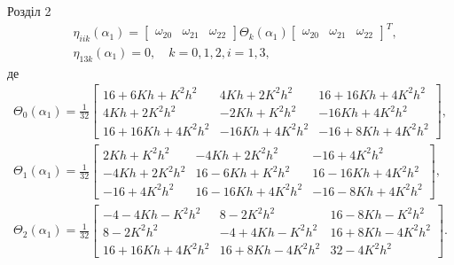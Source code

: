 \documentclass[8pt]{beamer}
\numberwithin{figure}{section}
\numberwithin{equation}{section}
\numberwithin{table}{section}
\begin{document}
\begin{frame}{Розділ 2}
\begin{equation}
\begin{aligned}
&\eta_{iik}\left(\alpha_1\right)=\left[\begin{array}{ccc}
\omega_{20} & \omega_{21} & \omega_{22}
\end{array} \right] \Theta_k\left(\alpha_1\right) \left[\begin{array}{ccc}
\omega_{20} & \omega_{21} & \omega_{22}
\end{array} \right]^T,\\
&\eta_{13k}\left(\alpha_1\right)=0, \quad k=0,1,2, i=1,3,
\end{aligned}
\end{equation}
де
\begin{equation}\label{eq:sqt_strain_nl}
\begin{aligned}
\Theta_0\left(\alpha_1\right)=\frac{1}{32}
\left[
\begin{array}{ccc}
16+6Kh+K^2h^2 & 4Kh+2K^2h^2 & 16+16Kh+4K^2h^2 \\ 
4Kh+2K^2h^2 & -2Kh+K^2h^2 & -16Kh+4K^2h^2 \\ 
16+16Kh+4K^2h^2 & -16Kh+4K^2h^2 & -16+8Kh+4K^2h^2
\end{array}
\right],\\
\Theta_1\left(\alpha_1\right)=\frac{1}{32}
\left[
\begin{array}{ccc}
2Kh+K^2h^2 & -4Kh+2K^2h^2 & -16+4K^2h^2 \\ 
-4Kh+2K^2h^2 & 16-6Kh+K^2h^2 & 16-16Kh+4K^2h^2 \\ 
-16+4K^2h^2  & 16-16Kh+4K^2h^2 & -16-8Kh+4K^2h^2
\end{array}
\right],\\
\Theta_2\left(\alpha_1\right)=\frac{1}{32}
\left[
\begin{array}{ccc}
-4-4Kh-K^2h^2 & 8-2K^2h^2 & 16-8Kh-K^2h^2 \\ 
8-2K^2h^2 & -4+4Kh-K^2h^2 & 16+8Kh-4K^2h^2 \\ 
16+16Kh+4K^2h^2 & 16+8Kh-4K^2h^2 & 32-4K^2h^2
\end{array}
\right].\\
\end{aligned}
\end{equation}

\end{frame}
\end{document}
